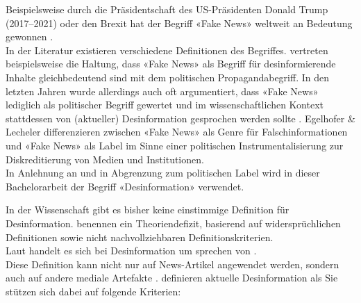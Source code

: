 \documentclass[12pt,a4paper]{article}        %
\begin{document}
Beispielsweise durch die Präsidentschaft des US-Präsidenten Donald Trump (2017–2021) oder den Brexit hat der Begriff «Fake News» weltweit an Bedeutung gewonnen \parencites[1f]{hohlfeld_schlechte_2020}[1]{marx_fake_2020}. \\
In der Literatur existieren verschiedene Definitionen des Begriffes. \textcite[246f]{hohlfeld_schlechte_2020} vertreten beispielsweise die Haltung, dass «Fake News» als Begriff für desinformierende Inhalte gleichbedeutend sind mit dem politischen Propagandabegriff. In den letzten Jahren wurde allerdings auch oft argumentiert, dass «Fake News» lediglich als politischer Begriff gewertet und im wissenschaftlichen Kontext stattdessen von (aktueller) Desinformation gesprochen werden sollte \parencites[3]{bontridder_role_2021}{habgood-coote_stop_2019}[148]{marx_fake_2020}. Egelhofer \& Lecheler \parencite[zit.\ nach][148]{marx_fake_2020} differenzieren zwischen «Fake News» als Genre für Falschinformationen und «Fake News» als Label im Sinne einer politischen Instrumentalisierung zur Diskreditierung von Medien und Institutionen.\\
In Anlehnung an \textcite{marx_fake_2020} und in Abgrenzung zum politischen Label wird in dieser Bachelorarbeit der Begriff «Desinformation» verwendet.

In der Wissenschaft gibt es bisher keine einstimmige Definition für Desinformation. 
\textcite[148f]{marx_fake_2020} benennen ein Theoriendefizit, basierend auf widersprüchlichen Definitionen sowie nicht nachvollziehbaren Definitionskriterien.\\
Laut \textcite[1094]{lazer_science_2018} handelt es sich bei Desinformation um 
\textcite[213]{allcott_social_2017} sprechen von  \parencites[vgl.\ auch][140]{tandoc_jr_defining_2018}[1094]{lazer_science_2018}.\\
Diese Definition kann nicht nur auf News-Artikel angewendet werden, sondern auch auf andere mediale Artefakte \parencite[3]{bontridder_role_2021} \parencite[vgl.\ auch][16]{reuter_fake_2019}. \textcite[1]{marx_fake_2020} definieren aktuelle Desinformation als  Sie stützen sich dabei auf folgende Kriterien:
\end{document}
